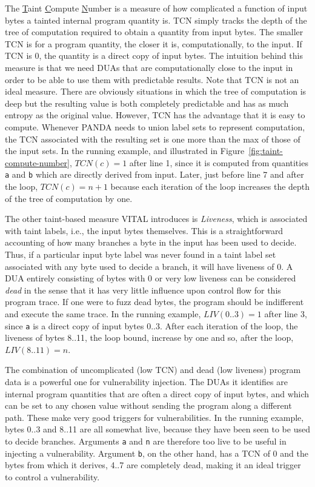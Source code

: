 The \underline{T}aint \underline{C}ompute \underline{N}umber is a measure of how complicated a function of input bytes a tainted internal program quantity is.
TCN simply tracks the depth of the tree of computation required to obtain a quantity from input bytes.
The smaller TCN is for a program quantity, the closer it is, computationally, to the input.
If TCN is 0, the quantity is a direct copy of input bytes.
The intuition behind this measure is that we need DUAs that are computationally close to the input in order to be able to use them with predictable results.
Note that TCN is not an ideal measure.
There are obviously situations in which the tree of computation is deep but the resulting value is both completely predictable and has as much entropy as the original value.
However, TCN has the advantage that it is easy to compute.
Whenever PANDA needs to union label sets to represent computation, the TCN associated with the resulting set is one more than the max of those of the 
input sets.
In the running example, and illustrated in Figure~\ref{fig:taint-compute-number}, $TCN(c)=1$ after line 1, since it is computed from quantities \verb+a+ and \verb+b+ which are directly derived from input.
Later, just before line 7 and after the loop, $TCN(c)=n+1$ because each iteration of the loop increases the depth of the tree of computation by one.  

The other taint-based measure VITAL introduces is \emph{Liveness}, which is associated with taint labels, i.e., the input bytes themselves.
This is a straightforward accounting of how many branches a byte in the input has been used to decide.
Thus, if a particular input byte label was never found in a taint label set associated with any byte used to decide a branch, it will have liveness of 0.
A DUA entirely consisting of bytes with 0 or very low liveness can be considered \emph{dead} in the sense that it has very little influence upon control flow for this program trace.
If one were to fuzz dead bytes, the program should be indifferent and execute the same trace.  
In the running example, $LIV(0..3)=1$ after line 3, since \verb+a+ is a direct copy of input bytes 0..3.
After each iteration of the loop, the liveness of bytes 8..11, the loop bound, increase by one and so, after the loop, $LIV(8..11)=n$.

The combination of uncomplicated (low TCN) and dead (low liveness) program data is a powerful one for vulnerability injection.
The DUAs it identifies are internal program quantities that are often a direct copy of input bytes, and which can be set to any chosen value without sending the program along a different path.  
These make very good triggers for vulnerabilities.
In the running example, bytes 0..3 and 8..11 are all somewhat live, because they have been seen to be used to decide branches.
Arguments \verb+a+ and \verb+n+ are therefore too live to be useful in injecting a vulnerability.
Argument \verb+b+, on the other hand, has a TCN of 0 and the bytes from which it derives, 4..7 are completely dead, 
making it an ideal trigger to control a vulnerability. 

